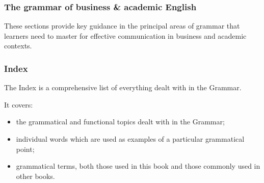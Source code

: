 \documentclass[oneside]{book}
\numberwithin{equation}{section}
\begin{document}
\subsubsection{The grammar of business \& academic English}
These sections provide key guidance in the principal areas of grammar that learners need to master for effective communication in business and academic contexts.

\subsubsection{Index}
The Index is a comprehensive list of everything dealt with in the Grammar.

It covers:
\begin{itemize}
    \item the grammatical and functional topics dealt with in the Grammar;
    \item individual words which are used as examples of a particular grammatical point;
    \item grammatical terms, both those used in this book and those commonly used in other books.
\end{itemize}
\end{document}
